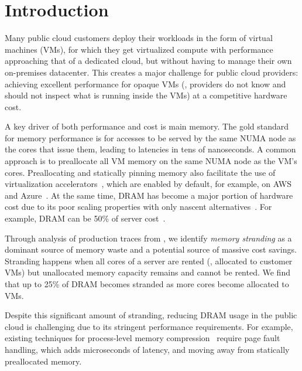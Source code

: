 
\section{Introduction}
\label{sec-new-intro}

Many public cloud customers deploy their workloads in the form of
virtual machines (VMs), for which they get virtualized compute with
performance approaching that of a dedicated cloud, but without having
to manage their own on-premises datacenter. This creates a major
challenge for public cloud providers: achieving excellent performance
for opaque VMs (\ie, providers do not know and should not inspect what
is running inside the VMs) at a competitive hardware cost.

A key driver of both performance and cost is main memory.  The gold
standard for memory performance is for accesses to be served by the
same NUMA node as the cores that issue them, leading to latencies in
tens of nanoseconds.  A common approach is to
preallocate all VM memory on the same NUMA node as the VM's cores.
Preallocating and statically pinning memory also facilitate the use
of virtualization
accelerators~\cite{nicpagefault.asplos17,tian2020coiommu,yassour2010dma,willmann2008protection,amit2011viommu,ben2010turtles},
which are enabled by default, for example, on AWS and
Azure~\cite{awsaccelnet,azureaccelnet}. At the same time,
DRAM has become a major portion of hardware cost due to its poor
scaling properties with only nascent
alternatives~\cite{memscaling.imw13, archshield.isca13, mutlu2015main,
  dramscaling.imw15, dramscalingchallenges.imw20,
  nextnewmemories.web19,micron3dxp.news21}.  For example, DRAM can be
50\% of server cost~\cite{cxlandgenz.web20}.

Through analysis of production traces from \azure,
we identify {\em memory stranding} as a dominant source of memory waste and a potential source of massive cost savings.
Stranding happens when all cores of a server are rented (\ie, allocated to customer VMs) but unallocated memory capacity remains and cannot be rented.
We find that up to 25\% of DRAM becomes stranded as more cores become allocated to VMs.

 Despite this
significant amount of stranding, reducing DRAM usage in the public
cloud is challenging due to its stringent performance requirements.
For example, existing techniques for process-level memory
compression~\cite{softfarmem.asplos19,weiner2022tmo} require page
fault handling, which adds microseconds of latency, and moving away
from statically preallocated memory.

